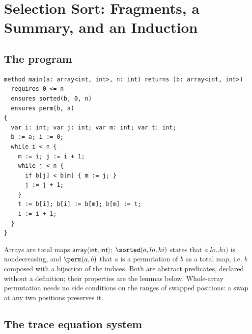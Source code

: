 \section{Selection Sort: Fragments, a Summary, and an Induction}\label{sec:sel}

\subsection{The program}

\begin{lstlisting}
method main(a: array<int, int>, n: int) returns (b: array<int, int>)
  requires 0 <= n
  ensures sorted(b, 0, n)
  ensures perm(b, a)
{
  var i: int; var j: int; var m: int; var t: int;
  b := a; i := 0;
  while i < n {
    m := i; j := i + 1;
    while j < n {
      if b[j] < b[m] { m := j; }
      j := j + 1;
    }
    t := b[i]; b[i] := b[m]; b[m] := t;
    i := i + 1;
  }
}
\end{lstlisting}

\noindent
Arrays are total maps $\mathsf{array}\langle\mathsf{int},\mathsf{int}\rangle$; $\sorted(a, lo, hi)$
states that $a[lo..hi)$ is nondecreasing, and $\perm(a, b)$ that $a$ is a permutation of $b$ as a total
map, i.e. $b$ composed with a bijection of the indices. Both are abstract predicates, declared without
a definition; their properties are the lemmas below. Whole-array permutation needs no side conditions
on the ranges of swapped positions: a swap at any two positions preserves it.

\subsection{The trace equation system}

